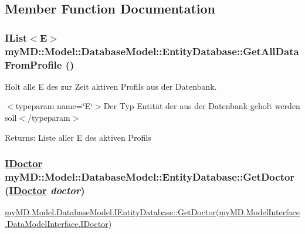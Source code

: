 \subsection{Member Function Documentation}
\hypertarget{classmy_m_d_1_1_model_1_1_database_model_1_1_entity_database_04d844f17f0406ef8ab2156907984b7e}{
\subsubsection[GetAllDataFromProfile]{\setlength{\rightskip}{0pt plus 5cm}IList$<$E$>$ my\-MD::Model::Database\-Model::Entity\-Database::Get\-All\-Data\-From\-Profile ()}}
\label{dd/d77/classmy_m_d_1_1_model_1_1_database_model_1_1_entity_database_04d844f17f0406ef8ab2156907984b7e}


Holt alle E des zur Zeit aktiven Profils aus der Datenbank. 

$<$typeparam name=\char`\"{}E\char`\"{}$>$Der Typ Entit\"{a}t der aus der Datenbank geholt werden soll$<$/typeparam$>$ \begin{Desc}
\item[Returns:]Liste aller E des aktiven Profils\end{Desc}
\hypertarget{classmy_m_d_1_1_model_1_1_database_model_1_1_entity_database_cc41e08b876f7f88b63138dc9ee26aea}{
\subsubsection[GetDoctor]{\setlength{\rightskip}{0pt plus 5cm}\hyperlink{interfacemy_m_d_1_1_model_interface_1_1_data_model_interface_1_1_i_doctor}{IDoctor} my\-MD::Model::Database\-Model::Entity\-Database::Get\-Doctor (\hyperlink{interfacemy_m_d_1_1_model_interface_1_1_data_model_interface_1_1_i_doctor}{IDoctor} {\em doctor})}}
\label{dd/d77/classmy_m_d_1_1_model_1_1_database_model_1_1_entity_database_cc41e08b876f7f88b63138dc9ee26aea}


\hyperlink{interfacemy_m_d_1_1_model_1_1_database_model_1_1_i_entity_database_cc41e08b876f7f88b63138dc9ee26aea}{my\-MD.Model.Database\-Model.IEntity\-Database::Get\-Doctor}(\hyperlink{interfacemy_m_d_1_1_model_interface_1_1_data_model_interface_1_1_i_doctor}{my\-MD.Model\-Interface.Data\-Model\-Interface.IDoctor}) 

